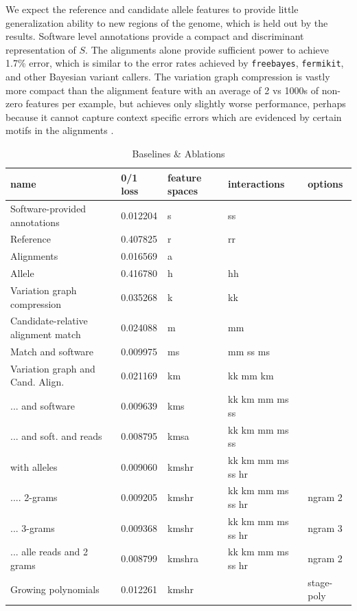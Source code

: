 \documentclass{article}
\begin{document}
We expect the reference and candidate allele features to provide little generalization ability to new regions of the genome, which is held out by the results.
Software level annotations provide a compact and discriminant representation of $S$.
The alignments alone provide sufficient power to achieve 1.7\% error, which is similar to the error rates achieved by {\tt freebayes}, {\tt fermikit}, and other Bayesian variant callers.
The variation graph compression is vastly more compact than the alignment feature with an average of 2 vs 1000s of non-zero features per example, but achieves only slightly worse performance, perhaps because it cannot capture context specific errors which are evidenced by certain motifs in the alignments \cite{nakamura2011sequence}.


\begin{table}[]
  \centering
  \caption{Baselines \& Ablations }
  \label{tab:ablate}
  \begin{tabular}{|l|l|l|l|l|}
    \hline
    name & 0/1 loss & feature spaces & interactions & options \\ \hline
    Software-provided annotations & 0.012204 & s & ss & \\
    Reference  & 0.407825 & r & rr &\\
    Alignments & 0.016569 & a & & \\
    Allele & 0.416780 & h & hh & \\
    Variation graph compression & 0.035268 & k & kk & \\
    Candidate-relative alignment match & 0.024088 & m & mm & \\
    Match and software & 0.009975 & ms & mm  ss  ms & \\
    Variation graph and Cand. Align. & 0.021169 & km & kk  mm  km & \\
    ... and software & 0.009639 & kms & kk  km  mm  ms  ss & \\
    ... and soft. and reads & 0.008795 & kmsa & kk  km  mm  ms  ss & \\
    with alleles & 0.009060 & kmshr & kk  km  mm  ms  ss  hr & \\
    .... 2-grams  & 0.009205 & kmshr & kk  km  mm  ms  ss  hr & ngram 2 \\
    ... 3-grams & 0.009368 & kmshr & kk  km  mm  ms  ss  hr & ngram 3 \\
    ... alle reads and 2 grams  & 0.008799 & kmshra & kk  km  mm  ms  ss  hr & ngram 2 \\
    Growing polynomials & 0.012261 & kmshr & & stage-poly \\
    \hline
  \end{tabular}
\end{table}
\end{document}

